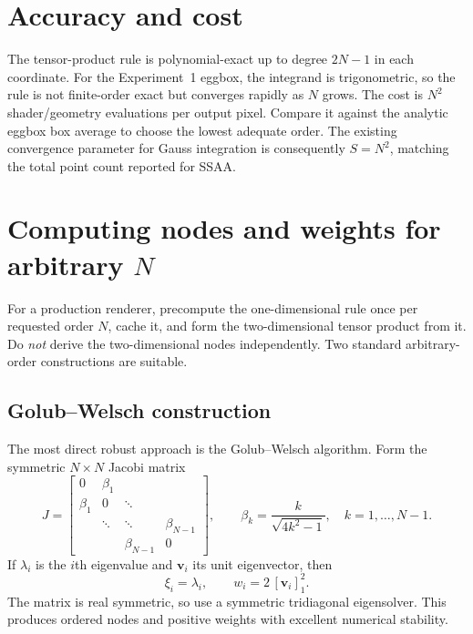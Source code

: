 \documentclass[11pt,a4paper]{article}
\begin{document}
\section{Accuracy and cost}

The tensor-product rule is polynomial-exact up to degree \(2N-1\) in each
coordinate.  For the Experiment~1 eggbox, the integrand is trigonometric, so
the rule is not finite-order exact but converges rapidly as \(N\) grows.  The
cost is \(N^2\) shader/geometry evaluations per output pixel.  Compare it
against the analytic eggbox box average to choose the lowest adequate order.
The existing convergence parameter for Gauss integration is consequently
\(S=N^2\), matching the total point count reported for SSAA.

\section{Computing nodes and weights for arbitrary \(N\)}

For a production renderer, precompute the one-dimensional rule once per
requested order \(N\), cache it, and form the two-dimensional tensor product
from it.  Do \emph{not} derive the two-dimensional nodes independently.
Two standard arbitrary-order constructions are suitable.

\subsection{Golub--Welsch construction}

The most direct robust approach is the Golub--Welsch algorithm.  Form the
symmetric \(N\times N\) Jacobi matrix
\begin{equation}
    J =
    \begin{bmatrix}
    0 & \beta_1 &  &  \\
    \beta_1 & 0 & \ddots & \\
     & \ddots & \ddots & \beta_{N-1}\\
     &  & \beta_{N-1} & 0
    \end{bmatrix},
    \qquad
    \beta_k=\frac{k}{\sqrt{4k^2-1}},
    \quad k=1,\ldots,N-1.
    \label{eq:golub-welsch-jacobi}
\end{equation}
If \(\lambda_i\) is the \(i\)th eigenvalue and
\(\mathbf{v}_i\) its unit eigenvector, then
\begin{equation}
    \boxed{
        \xi_i=\lambda_i,
        \qquad
        w_i=2\,[\mathbf{v}_i]_1^2.
    }
    \label{eq:golub-welsch-rule}
\end{equation}
The matrix is real symmetric, so use a symmetric tridiagonal eigensolver.
This produces ordered nodes and positive weights with excellent numerical
stability.
\end{document}
